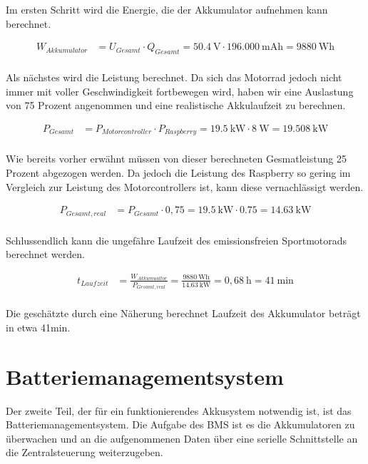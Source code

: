 Im ersten Schritt wird die Energie, die der Akkumulator aufnehmen kann berechnet.

\begin{align*}
W_{Akkumulator} &= U_{Gesamt} \cdot Q_{Gesamt} = 50.4~\mathrm{V} \cdot 196.000~\mathrm{mAh} = 9880~\mathrm{Wh}\\
\end{align*}

Als nächstes wird die Leistung berechnet. Da sich das Motorrad jedoch nicht immer mit voller Geschwindigkeit fortbewegen wird, haben wir eine Auslastung von 75 Prozent angenommen und eine realistische Akkulaufzeit zu berechnen.

\begin{align*}
P_{Gesamt} &= P_{Motorcontroller} \cdot P_{Raspberry} = 19.5~\mathrm{kW} \cdot 8~\mathrm{W} = 19.508~\mathrm{kW}\\
\end{align*}

Wie bereits vorher erwähnt müssen von dieser berechneten Gesmatleistung 25 Prozent abgezogen werden. Da jedoch die Leistung des Raspberry so gering im Vergleich zur Leistung des Motorcontrollers ist, kann diese vernachlässigt werden.

\begin{align*}
P_{Gesamt,real} &= P_{Gesamt} \cdot 0,75 = 19.5~\mathrm{kW} \cdot 0.75 = 14.63~\mathrm{kW}\\
\end{align*}

Schlussendlich kann die ungefähre Laufzeit des emissionsfreien Sportmotorads berechnet werden.

\begin{align*}
t_{Laufzeit} &= \frac{W_{Akkumualtor}}{P_{Gesamt,real}} = \frac{9880~\mathrm{Wh}}{14.63~\mathrm{kW}} = 0,68~\mathrm{h} = 41~\mathrm{min}\\
\end{align*}

Die geschätzte durch eine Näherung berechnet Laufzeit des Akkumulator beträgt in etwa 41min.
\newpage

\section{Batteriemanagementsystem}
Der zweite Teil, der für ein funktionierendes Akkusystem notwendig ist, ist das Batteriemanagementsystem. Die Aufgabe des BMS ist es die Akkumulatoren zu überwachen und an die aufgenommenen Daten über eine serielle Schnittstelle an die Zentralsteuerung weiterzugeben. 

